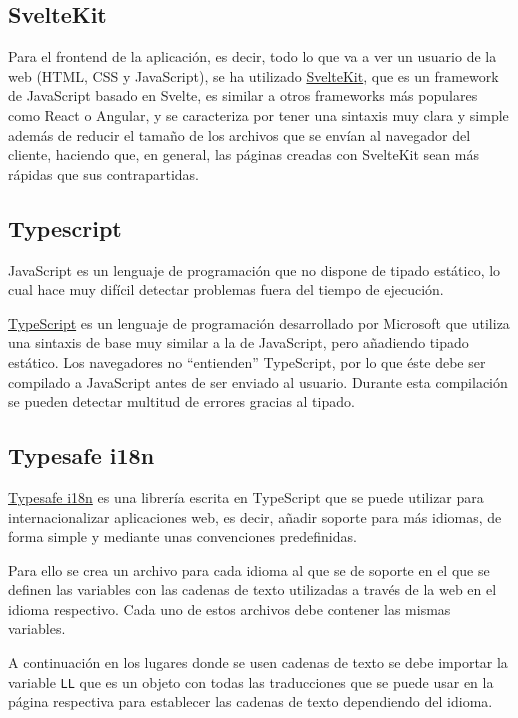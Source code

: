 \subsection{SvelteKit}

Para el frontend de la aplicación, es decir, todo lo que va a ver un usuario de
la web (HTML, CSS y JavaScript), se ha utilizado
\href{https://kit.svelte.dev/}{SvelteKit}, que es un framework de JavaScript
basado en Svelte, es similar a otros frameworks más populares como React o
Angular, y se caracteriza por tener una sintaxis muy clara y simple además de
reducir el tamaño de los archivos que se envían al navegador del cliente,
haciendo que, en general, las páginas creadas con SvelteKit sean más rápidas que
sus contrapartidas.

\subsection{Typescript}

JavaScript es un lenguaje de programación que no dispone de tipado estático, lo
cual hace muy difícil detectar problemas fuera del tiempo de ejecución.

\href{https://www.typescriptlang.org/}{TypeScript} es un lenguaje de
programación desarrollado por Microsoft que utiliza una sintaxis de base muy
similar a la de JavaScript, pero añadiendo tipado estático. Los navegadores no
``entienden'' TypeScript, por lo que éste debe ser compilado a JavaScript antes
de ser enviado al usuario. Durante esta compilación se pueden detectar multitud
de errores gracias al tipado.

\subsection{Typesafe i18n}

\href{https://github.com/ivanhofer/typesafe-i18n}{Typesafe i18n} es una librería
escrita en TypeScript que se puede utilizar para internacionalizar aplicaciones
web, es decir, añadir soporte para más idiomas, de forma simple y mediante unas
convenciones predefinidas.

Para ello se crea un archivo para cada idioma al que se de soporte en el que se
definen las variables con las cadenas de texto utilizadas a través de la web en
el idioma respectivo. Cada uno de estos archivos debe contener las mismas
variables.

A continuación en los lugares donde se usen cadenas de texto se debe importar la
variable \texttt{LL} que es un objeto con todas las traducciones que se puede
usar en la página respectiva para establecer las cadenas de texto dependiendo
del idioma.

